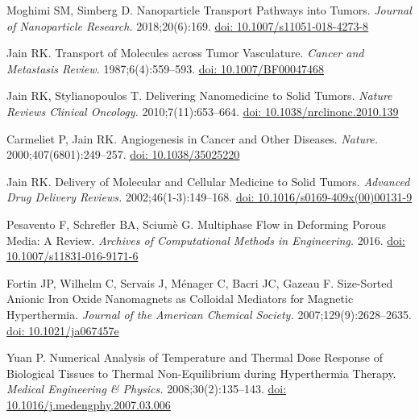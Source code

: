 \documentclass[Times1COL,AMA]{WileyNJDv5} %
\begin{document}
\begin{thebibliography}{10}
    Moghimi SM, Simberg D. Nanoparticle Transport Pathways into Tumors. {\it
            Journal of Nanoparticle Research.} 2018\string;20(6)\string:169.
    \newblock \href {\doibase 10.1007/s11051-018-4273-8} {doi:
        10.1007/s11051-018-4273-8}

    Jain RK. Transport of Molecules across Tumor Vasculature. {\it Cancer and
            Metastasis Review.} 1987\string;6(4)\string:559--593.
    \newblock \href {\doibase 10.1007/BF00047468} {doi: 10.1007/BF00047468}

    Jain RK, Stylianopoulos T. Delivering Nanomedicine to Solid Tumors. {\it Nature
            Reviews Clinical Oncology.} 2010\string;7(11)\string:653--664.
    \newblock \href {\doibase 10.1038/nrclinonc.2010.139} {doi:
        10.1038/nrclinonc.2010.139}

    Carmeliet P, Jain RK. Angiogenesis in Cancer and Other Diseases. {\it Nature.}
    2000\string;407(6801)\string:249--257.
    \newblock \href {\doibase 10.1038/35025220} {doi: 10.1038/35025220}

    Jain RK. Delivery of Molecular and Cellular Medicine to Solid Tumors. {\it
            Advanced Drug Delivery Reviews.} 2002\string;46(1-3)\string:149--168.
    \newblock \href {\doibase 10.1016/s0169-409x(00)00131-9} {doi:
        10.1016/s0169-409x(00)00131-9}

    Pesavento F, Schrefler BA, Scium{\`e} G. Multiphase {{Flow}} in {{Deforming
                    Porous Media}}: {{A Review}}. {\it Archives of Computational Methods in
    Engineering.} 2016.
    \newblock \href {\doibase 10.1007/s11831-016-9171-6} {doi:
        10.1007/s11831-016-9171-6}

    Fortin JP, Wilhelm C, Servais J, M{\'e}nager C, Bacri JC, Gazeau F.
    Size-{{Sorted Anionic Iron Oxide Nanomagnets}} as {{Colloidal Mediators}} for
        {{Magnetic Hyperthermia}}. {\it Journal of the American Chemical Society.}
    2007\string;129(9)\string:2628--2635.
    \newblock \href {\doibase 10.1021/ja067457e} {doi: 10.1021/ja067457e}

    Yuan P. Numerical Analysis of Temperature and Thermal Dose Response of
    Biological Tissues to Thermal Non-Equilibrium during Hyperthermia Therapy.
        {\it Medical Engineering \& Physics.} 2008\string;30(2)\string:135--143.
    \newblock \href {\doibase 10.1016/j.medengphy.2007.03.006} {doi:
        10.1016/j.medengphy.2007.03.006}


\end{thebibliography}
\end{document}
